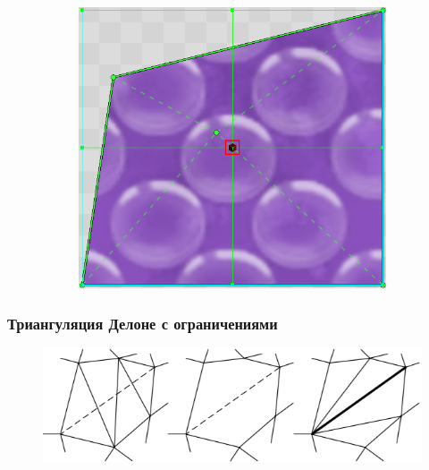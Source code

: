 \documentclass[10pt, unicode]{beamer}
\begin{document}
\begin{frame}
\begin{figure}[H]
\begin{subfigure}[H]{0.33\linewidth}
            \end{subfigure}
            \begin{subfigure}{0.33\linewidth}
                \centering
                \includegraphics[scale=0.225]{DeleteBoundary3.png}
            \end{subfigure}
        \end{figure}
    \end{frame}
    \begin{frame}
        \frametitle{Триангуляция Делоне с ограничениями}
        \begin{figure}[H]
            \centering
            \includegraphics[width=\linewidth, keepaspectratio]{DestroyAndBuild.png}
        \end{figure}
    \end{frame}
\end{document}

